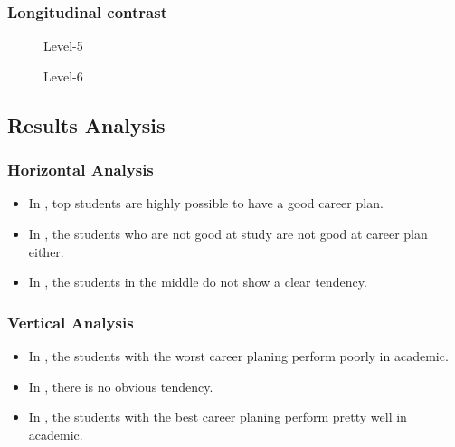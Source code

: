 \begin{frame}
    \frametitle{Longitudinal contrast}
    \begin{figure}[htbp]
        \centering
        \begin{minipage}[t]{0.4\textwidth}
            \centering
            \caption{Level-5} \label{fig:pie11}
        \end{minipage}
        \begin{minipage}[t]{0.4\textwidth}
            \centering
            \caption{Level-6} \label{fig:pie12}
        \end{minipage}
    \end{figure}
\end{frame}

\subsection{Results Analysis}
\begin{frame}
    \frametitle{Horizontal Analysis}
    \Large
    \begin{itemize}[<+->]
        \item In , top students are highly possible to have a good career plan.
        \item In , the students who are not good at study are not good at career plan either.
        \item In , the students in the middle do not show a clear tendency.
    \end{itemize}
\end{frame}

\begin{frame}
    \frametitle{Vertical Analysis}
    \Large
    \begin{itemize}
        \item In , the students with the worst career planing perform poorly in academic.
        \item In , there is no obvious tendency.
        \item In , the students with the best career planing perform pretty well in academic.
    \end{itemize}
\end{frame}